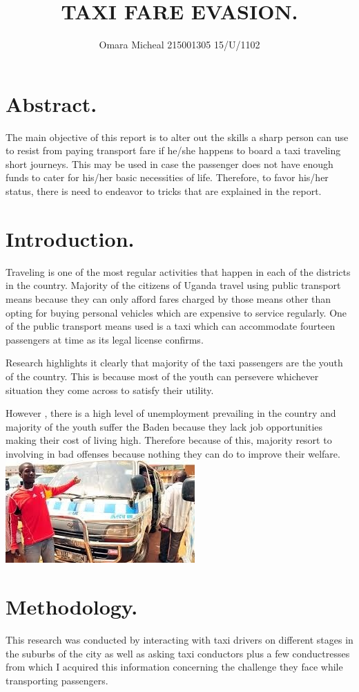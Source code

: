 \documentclass{article}
\begin{document}
\title{TAXI FARE EVASION.}

		\author{Omara Micheal   215001305  15/U/1102}
		\maketitle

\section{Abstract.}
{The main objective of this report is to alter out the skills a sharp person can use to resist from paying transport fare if he/she happens to board a taxi traveling short journeys. This may be used   in case the passenger does not have enough funds to cater for his/her basic necessities of life. Therefore, to favor his/her status, there is need to endeavor to tricks that are explained in the report.}
\section{Introduction.}
Traveling is one of the most regular activities that happen in each of the districts in the country. Majority of the citizens of Uganda travel using public transport means because they can only afford fares charged by those means other than opting for buying personal vehicles which are expensive to service regularly. One of the public transport means used is a taxi which can accommodate fourteen passengers at time as its legal license confirms.

Research highlights it clearly that majority of the taxi passengers are the youth of the country. This is because most of the youth can persevere whichever situation they come across to satisfy their utility.

However , there is a high level of unemployment prevailing in the country and majority of the youth suffer the Baden because they lack job opportunities making their cost of living high. Therefore because of this, majority resort to involving in bad offenses because nothing they can do to improve their welfare. 
\includegraphics{taxi11.jpeg}
\section{Methodology.}
{This research was conducted by interacting with taxi drivers on different stages in the suburbs of the city as well as asking taxi conductors plus a few conductresses from which I acquired this information concerning the challenge they face while transporting passengers. }
\end{document}
